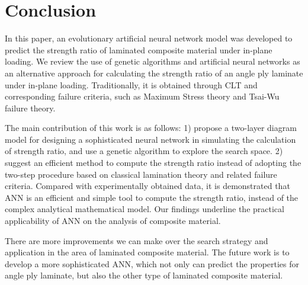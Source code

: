 \section{Conclusion}
In this paper, an evolutionary artificial neural network model was developed to
predict the strength ratio of laminated composite material under in-plane
loading. We review the use of genetic algorithms and artificial neural networks
as an alternative approach for calculating the strength ratio of an angle ply
laminate under in-plane loading. Traditionally, it is obtained through CLT and
corresponding failure criteria, such as Maximum Stress theory and Tsai-Wu
failure theory.

The main contribution of this work is as follows: 1) propose a two-layer diagram
model for designing a sophisticated neural network in simulating the calculation
of strength ratio, and use a genetic algorithm to explore the search space. 2)
suggest an efficient method to compute the strength ratio instead of adopting
the two-step procedure based on classical lamination theory and related failure
criteria. Compared with experimentally obtained data, it is demonstrated that
ANN is an efficient and simple tool to compute the strength ratio, instead of
the complex analytical mathematical model. Our findings underline the practical
applicability of ANN on the analysis of composite material.

There are more improvements we can make over the search strategy and application
in the area of laminated composite material. The future work is to develop a
more sophisticated ANN, which not only can predict the properties for angle ply
laminate, but also the other type of laminated composite material.

